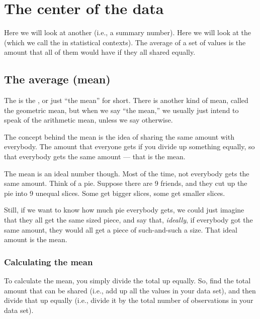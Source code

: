 \documentclass[../../../main.tex]{subfiles}
\begin{document}
\chapter{The center of the data}

Here we will look at another  (i.e., a summary number). Here we will look at the  (which we call the  in statistical contexts). The average of a set of values is the amount that all of them would have if they all shared equally.


\section{The average (mean)}

The  is the , or just ``the mean'' for short. There is another kind of mean, called the geometric mean, but when we say ``the mean,'' we usually just intend to speak of the arithmetic mean, unless we say otherwise.

The concept behind the mean is the idea of sharing the same amount with everybody. The amount that everyone gets if you divide up something equally, so that everybody gets the same amount --- that is the mean.

The mean is an ideal number though. Most of the time, not everybody gets the same amount. Think of a pie. Suppose there are 9 friends, and they cut up the pie into 9 unequal slices. Some get bigger slices, some get smaller slices. 

Still, if we want to know how much pie everybody gets, we could just imagine that they all get the same sized piece, and say that, \emph{ideally}, if everybody got the same amount, they would all get a piece of such-and-such a size. That ideal amount is the mean.


\subsection{Calculating the mean}

To calculate the mean, you simply divide the total up equally. So, find the total amount that can be shared (i.e., add up all the values in your data set), and then divide that up equally (i.e., divide it by the total number of observations in your data set). 
\end{document}
